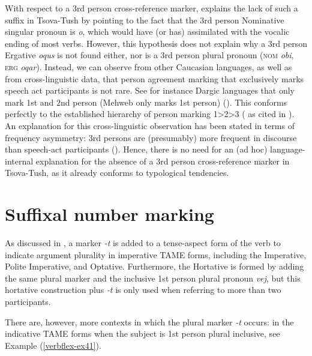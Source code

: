With respect to a 3rd person cross-reference marker, \textcite[85]{desheriev53} explains the lack of such a suffix in Tsova-Tush by pointing to the fact that the 3rd person Nominative singular pronoun is \textit{o}, which would have (or has) assimilated with the vocalic ending of most verbs. However, this hypothesis does not explain why a 3rd person Ergative \textit{oqus} is not found either, nor is a 3rd person plural pronoun (\textsc{nom} \textit{obi}, \textsc{erg} \textit{oqar}). Instead, we can observe from other Caucasian languages, as well as from cross-linguistic data, that person agreement marking that exclusively marks speech act participants is not rare. See for instance Dargic languages that only mark 1st and 2nd person (Mehweb only marks 1st person) (\cites{magometov62}[138]{helmbrecht96}{sumbatova11}). This conforms perfectly to the established hierarchy of person marking 1>2>3 (\cites[152]{givon76}[162]{croft88} as cited in \cites[128]{helmbrecht96}). An explanation for this cross-linguistic observation has been stated in terms of frequency asymmetry: 3rd persons are (presumably) more frequent in discourse than speech-act participants (\cite{haspelmath2021assymmetry}). Hence, there is no need for an (ad hoc) language-internal explanation for the absence of a 3rd person cross-reference marker in Tsova-Tush, as it already conforms to typological tendencies.



\section{Suffixal number marking} \label{suffixpl}

As discussed in , a marker \textit{-t} is added to a tense-aspect form of the verb to indicate argument plurality in imperative TAME forms, including the Imperative, Polite Imperative, and Optative. Furthermore, the Hortative is formed by adding the same plural marker and the inclusive 1st person plural pronoun \textit{vej}, but this hortative construction plus \textit{-t} is only used when referring to more than two participants.

There are, however, more contexts in which the plural marker \textit{-t} occurs: in the indicative TAME forms when the subject is 1st person plural inclusive, see Example (\ref{verbflex-ex41}).


